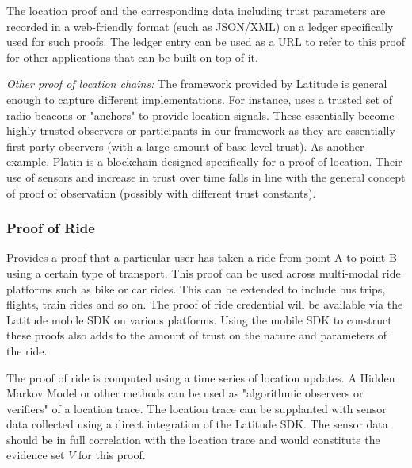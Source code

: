 The location proof and the corresponding data including trust parameters are recorded in a web-friendly format (such as
JSON/XML) on a ledger specifically used for such proofs. The ledger entry can be used as a URL to refer to this proof
for other applications that can be built on top of it.

\noindent
{\em Other proof of location chains:}
The framework provided by Latitude is general enough to capture different implementations. For instance, \cite{foam}
uses a trusted set of radio beacons or "anchors" to provide location signals. These essentially become highly trusted
observers or participants in our framework as they are essentially first-party observers (with a large amount of
base-level trust). As another example, Platin is a blockchain designed specifically for a proof of location. Their use
of sensors and increase in trust over time falls in line with the general concept of proof of observation (possibly with
different trust constants).

\subsubsection{Proof of Ride}

Provides a proof that a particular user has taken a ride from point A to point B using a
certain type of transport. This proof can be used across multi-modal ride platforms such as bike or car rides.  This can
be extended to include bus trips, flights, train rides and so on. The proof of ride credential will be available via the
Latitude mobile SDK on various platforms. Using the mobile SDK to construct these proofs also adds to the amount of
trust on the nature and parameters of the ride.  

The proof of ride is computed using a time series of location updates. A Hidden Markov Model or other methods
\cite{wu2011} can be used as "algorithmic observers or verifiers" of a location trace. The location trace can be
supplanted with sensor data collected using a direct integration of the Latitude SDK. The sensor data should be in full
correlation with the location trace and would constitute the evidence set $V$ for this proof.

